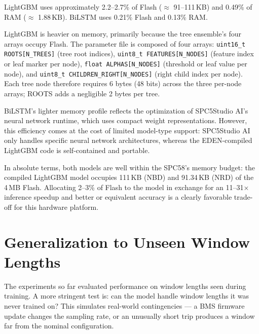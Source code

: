LightGBM uses approximately 2.2--2.7\% of Flash ($\approx$ 91--111\,KB) and 0.49\% of RAM ($\approx$ 1.88\,KB). BiLSTM uses 0.21\% Flash and 0.13\% RAM.

LightGBM is heavier on memory, primarily because the tree ensemble's four arrays occupy Flash. The parameter file is composed of four arrays: \texttt{uint16\_t ROOTS[N\_TREES]} (tree root indices), \texttt{uint8\_t FEATURES[N\_NODES]} (feature index or leaf marker per node), \texttt{float ALPHAS[N\_NODES]} (threshold or leaf value per node), and \texttt{uint8\_t CHILDREN\_RIGHT[N\_NODES]} (right child index per node). Each tree node therefore requires 6 bytes (48 bits) across the three per-node arrays; ROOTS adds a negligible 2 bytes per tree.

BiLSTM's lighter memory profile reflects the optimization of SPC5Studio AI's neural network runtime, which uses compact weight representations. However, this efficiency comes at the cost of limited model-type support: SPC5Studio AI only handles specific neural network architectures, whereas the EDEN-compiled LightGBM code is self-contained and portable.

In absolute terms, both models are well within the SPC58's memory budget: the compiled LightGBM model occupies 111\,KB (NBD) and 91.34\,KB (NRD) of the 4\,MB Flash. Allocating 2--3\% of Flash to the model in exchange for an 11--31$\times$ inference speedup and better or equivalent accuracy is a clearly favorable trade-off for this hardware platform.


\section{Generalization to Unseen Window Lengths}
\label{sec:exp_generalization}

The experiments so far evaluated performance on window lengths seen during training. A more stringent test is: can the model handle window lengths it was never trained on? This simulates real-world contingencies --- a BMS firmware update changes the sampling rate, or an unusually short trip produces a window far from the nominal configuration.

